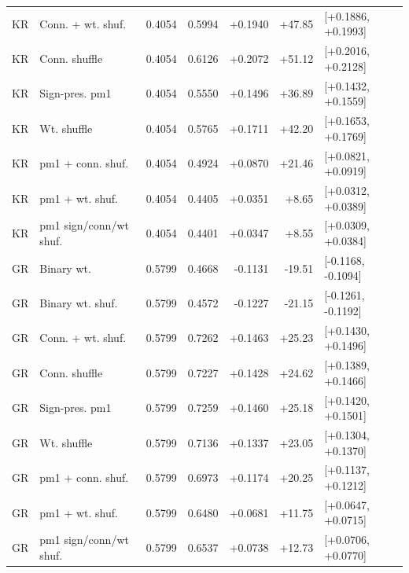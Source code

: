 \begin{tabular}{llrrrrl}
KR & Conn. + wt. shuf. & 0.4054 & 0.5994 & +0.1940 & +47.85 & [+0.1886, +0.1993] \\
KR & Conn. shuffle & 0.4054 & 0.6126 & +0.2072 & +51.12 & [+0.2016, +0.2128] \\
KR & Sign-pres. pm1 & 0.4054 & 0.5550 & +0.1496 & +36.89 & [+0.1432, +0.1559] \\
KR & Wt. shuffle & 0.4054 & 0.5765 & +0.1711 & +42.20 & [+0.1653, +0.1769] \\
KR & pm1 + conn. shuf. & 0.4054 & 0.4924 & +0.0870 & +21.46 & [+0.0821, +0.0919] \\
KR & pm1 + wt. shuf. & 0.4054 & 0.4405 & +0.0351 & +8.65 & [+0.0312, +0.0389] \\
KR & pm1 sign/conn/wt shuf. & 0.4054 & 0.4401 & +0.0347 & +8.55 & [+0.0309, +0.0384] \\
GR & Binary wt. & 0.5799 & 0.4668 & -0.1131 & -19.51 & [-0.1168, -0.1094] \\
GR & Binary wt. shuf. & 0.5799 & 0.4572 & -0.1227 & -21.15 & [-0.1261, -0.1192] \\
GR & Conn. + wt. shuf. & 0.5799 & 0.7262 & +0.1463 & +25.23 & [+0.1430, +0.1496] \\
GR & Conn. shuffle & 0.5799 & 0.7227 & +0.1428 & +24.62 & [+0.1389, +0.1466] \\
GR & Sign-pres. pm1 & 0.5799 & 0.7259 & +0.1460 & +25.18 & [+0.1420, +0.1501] \\
GR & Wt. shuffle & 0.5799 & 0.7136 & +0.1337 & +23.05 & [+0.1304, +0.1370] \\
GR & pm1 + conn. shuf. & 0.5799 & 0.6973 & +0.1174 & +20.25 & [+0.1137, +0.1212] \\
GR & pm1 + wt. shuf. & 0.5799 & 0.6480 & +0.0681 & +11.75 & [+0.0647, +0.0715] \\
GR & pm1 sign/conn/wt shuf. & 0.5799 & 0.6537 & +0.0738 & +12.73 & [+0.0706, +0.0770] \\
\bottomrule
\end{tabular}
